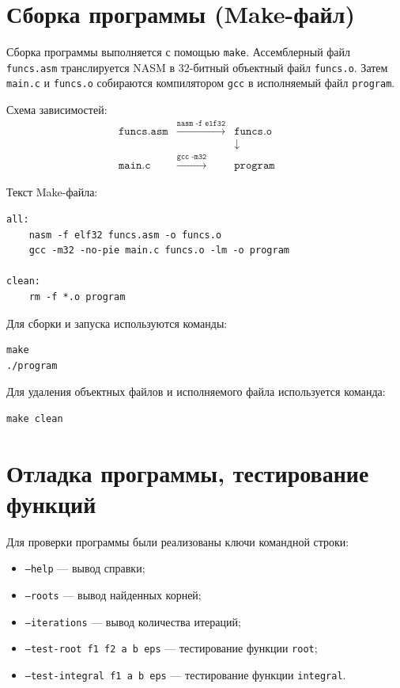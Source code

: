 \documentclass[a4paper,12pt,titlepage,finall]{article}
\begin{document}
\newpage

\section{Сборка программы (Make-файл)}

Сборка программы выполняется с помощью \texttt{make}. Ассемблерный файл \texttt{funcs.asm} транслируется NASM в 32-битный объектный файл \texttt{funcs.o}. Затем \texttt{main.c} и \texttt{funcs.o} собираются компилятором \texttt{gcc} в исполняемый файл \texttt{program}.

Схема зависимостей:
\[
\begin{array}{ccccc}
\texttt{funcs.asm} & \xrightarrow{\texttt{nasm -f elf32}} & \texttt{funcs.o} & & \\
 & & \downarrow & & \\
\texttt{main.c} & \xrightarrow{\texttt{gcc -m32}} & \texttt{program} & &
\end{array}
\]

Текст Make-файла:
\begin{verbatim}
all:
	nasm -f elf32 funcs.asm -o funcs.o
	gcc -m32 -no-pie main.c funcs.o -lm -o program

clean:
	rm -f *.o program
\end{verbatim}

Для сборки и запуска используются команды:
\begin{verbatim}
make
./program
\end{verbatim}
Для удаления объектных файлов и исполняемого файла используется команда:
\begin{verbatim}
make clean
\end{verbatim}

\newpage

\section{Отладка программы, тестирование функций}

Для проверки программы были реализованы ключи командной строки:
\begin{itemize}
    \item \texttt{--help} --- вывод справки;
    \item \texttt{--roots} --- вывод найденных корней;
    \item \texttt{--iterations} --- вывод количества итераций;
    \item \texttt{--test-root f1 f2 a b eps} --- тестирование функции \texttt{root};
    \item \texttt{--test-integral f1 a b eps} --- тестирование функции \texttt{integral}.
\end{itemize}
\end{document}
